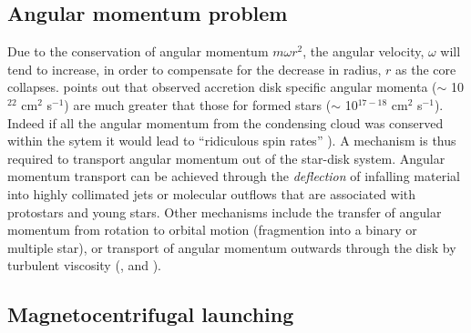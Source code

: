 \subsection{Angular momentum problem}
Due to the conservation of angular momentum $m \omega r^2$, the angular velocity, $\omega$
will tend to increase, in order to compensate for the decrease in radius, $r$ as the core collapses.
\citet{1985ApJ...293..216P} points out that observed accretion disk
specific angular momenta ($\sim$ 10$^{22}$ cm$^2$ s$^{-1}$) are much greater that those for formed stars ($\sim$ 10$^{17-18}$ cm$^2$ s$^{-1}$).
%
%
Indeed if all the angular momentum from the condensing cloud was conserved
within the sytem it would lead to ``ridiculous spin rates''
\citep{1974MNRAS.168..603L}).
A mechanism is thus required to transport angular momentum out of the star-disk
system.
Angular momentum transport can be achieved through the \emph{deflection} of infalling material into highly collimated jets or molecular outflows that are associated with protostars and young stars.
Other mechanisms include the transfer of angular momentum from rotation to
orbital motion (fragmention into a binary or multiple star), or transport of angular momentum
outwards through the disk by turbulent viscosity (\citet{1943ZA.....24..181V},
\citet{1952ZN.....34..263L} and
\citet{1974MNRAS.168..603L}).


\subsection{Magnetocentrifugal launching}

